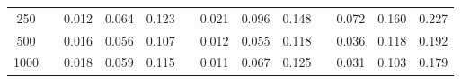 % 
\begin{tabular}{ccccccccccccc}
  \hline
  \hline
250 &  & 0.012 & 0.064 & 0.123 &  & 0.021 & 0.096 & 0.148 &  & 0.072 & 0.160 & 0.227 \\ 
  500 &  & 0.016 & 0.056 & 0.107 &  & 0.012 & 0.055 & 0.118 &  & 0.036 & 0.118 & 0.192 \\ 
  1000 &  & 0.018 & 0.059 & 0.115 &  & 0.011 & 0.067 & 0.125 &  & 0.031 & 0.103 & 0.179 \\ 
   \hline
\end{tabular}
